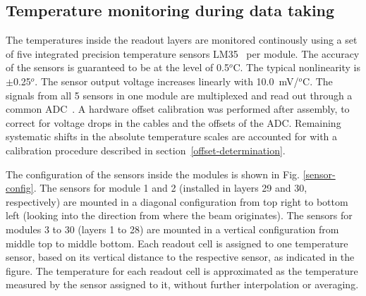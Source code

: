 \documentclass[a4paper,10pt]{article}
\begin{document}
\subsection{Temperature monitoring during data taking}
The temperatures inside the readout layers are monitored continously using a set of five
integrated precision temperature sensors LM35~\cite{temp-sensors} per module. The accuracy
of the sensors is guaranteed to be at the level of 0.5$^o$C. The typical nonlinearity is $\pm$0.25$^o$. 
The sensor output voltage increases linearly with 10.0~mV/$^o$C. The signals from all 5 sensors in one
module are multiplexed and read out through a common ADC~\cite{sven-karstensen-private}. 
A hardware offset calibration was performed after assembly, to correct for  
voltage drops in the cables and the offsets
of the ADC. Remaining systematic shifts in the absolute temperature scales are accounted for with a 
calibration procedure described in section~\ref{offset-determination}. 

The configuration of the sensors inside
the modules is shown in Fig. \ref{sensor-config}. The sensors for module 1 and 2 (installed in layers 29 and 30,
respectively)
are mounted in a diagonal configuration from top right to bottom left (looking into the direction from where
the beam originates).  The sensors for modules 3 to
30 (layers 1 to 28) are mounted in a vertical configuration from middle top to middle bottom. 
Each readout cell is assigned to one temperature sensor, based on its vertical distance to the respective 
sensor, as indicated in the figure.
The temperature for each readout cell is approximated as the temperature measured by the sensor assigned
to it, without further interpolation or averaging. 
\end{document}
